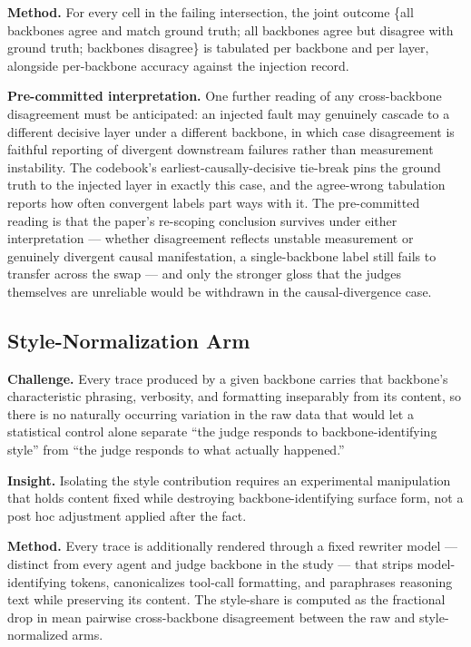 \documentclass[11pt]{article}
\begin{document}
\textbf{Method.} For every cell in the failing intersection, the joint outcome \{all backbones agree and match ground truth; all backbones agree but disagree with ground truth; backbones disagree\} is tabulated per backbone and per layer, alongside per-backbone accuracy against the injection record.

\textbf{Pre-committed interpretation.} One further reading of any cross-backbone disagreement must be anticipated: an injected fault may genuinely cascade to a different decisive layer under a different backbone, in which case disagreement is faithful reporting of divergent downstream failures rather than measurement instability. The codebook's earliest-causally-decisive tie-break pins the ground truth to the injected layer in exactly this case, and the agree-wrong tabulation reports how often convergent labels part ways with it. The pre-committed reading is that the paper's re-scoping conclusion survives under either interpretation --- whether disagreement reflects unstable measurement or genuinely divergent causal manifestation, a single-backbone label still fails to transfer across the swap --- and only the stronger gloss that the judges themselves are unreliable would be withdrawn in the causal-divergence case.

\subsection{Style-Normalization Arm}
\textbf{Challenge.} Every trace produced by a given backbone carries that backbone's characteristic phrasing, verbosity, and formatting inseparably from its content, so there is no naturally occurring variation in the raw data that would let a statistical control alone separate ``the judge responds to backbone-identifying style'' from ``the judge responds to what actually happened.''

\textbf{Insight.} Isolating the style contribution requires an experimental manipulation that holds content fixed while destroying backbone-identifying surface form, not a post hoc adjustment applied after the fact.

\textbf{Method.} Every trace is additionally rendered through a fixed rewriter model --- distinct from every agent and judge backbone in the study --- that strips model-identifying tokens, canonicalizes tool-call formatting, and paraphrases reasoning text while preserving its content. The style-share is computed as the fractional drop in mean pairwise cross-backbone disagreement between the raw and style-normalized arms.
\end{document}

